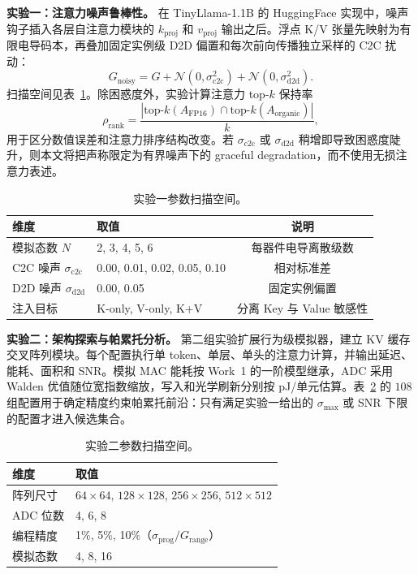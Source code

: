 \noindent\textbf{实验一：注意力噪声鲁棒性。}\label{sec:exp1_noise}
在 TinyLlama-1.1B 的 HuggingFace 实现中，噪声钩子插入各层自注意力模块的 $k_{\text{proj}}$ 和 $v_{\text{proj}}$ 输出之后。浮点 K/V 张量先映射为有限电导码本，再叠加固定实例级 D2D 偏置和每次前向传播独立采样的 C2C 扰动：
\begin{equation}
G_{\text{noisy}} = G + \mathcal{N}(0, \sigma_{\text{c2c}}^2) + \mathcal{N}(0, \sigma_{\text{d2d}}^2).
\label{eq:noise_model}
\end{equation}
扫描空间见表~\ref{tab:exp1_grid}。除困惑度外，实验计算注意力 top-$k$ 保持率
\begin{equation}
\rho_{\text{rank}} = \frac{|\text{top-}k(A_{\text{FP16}}) \cap \text{top-}k(A_{\text{organic}})|}{k},
\label{eq:rank_preservation}
\end{equation}
用于区分数值误差和注意力排序结构改变。若 $\sigma_{\text{c2c}}$ 或 $\sigma_{\text{d2d}}$ 稍增即导致困惑度陡升，则本文将把声称限定为有界噪声下的 graceful degradation，而不使用无损注意力表述。

\begin{table}[!htbp]
\centering
\caption{实验一参数扫描空间。}
\label{tab:exp1_grid}
\begin{tabular}{@{}llc@{}}
\toprule
维度 & 取值 & 说明 \\
\midrule
模拟态数 $N$ & 2, 3, 4, 5, 6 & 每器件电导离散级数 \\
C2C 噪声 $\sigma_{\text{c2c}}$ & 0.00, 0.01, 0.02, 0.05, 0.10 & 相对标准差 \\
D2D 噪声 $\sigma_{\text{d2d}}$ & 0.00, 0.05 & 固定实例偏置 \\
注入目标 & K-only, V-only, K+V & 分离 Key 与 Value 敏感性 \\
\bottomrule
\end{tabular}
\end{table}

\noindent\textbf{实验二：架构探索与帕累托分析。}\label{sec:exp2_arch}
第二组实验扩展行为级模拟器，建立 KV 缓存交叉阵列模块。每个配置执行单 token、单层、单头的注意力计算，并输出延迟、能耗、面积和 SNR。模拟 MAC 能耗按 Work~1 的一阶模型继承，ADC 采用 Walden 优值随位宽指数缩放，写入和光学刷新分别按 pJ/单元估算。表~\ref{tab:exp2_grid} 的 $108$ 组配置用于确定精度约束帕累托前沿：只有满足实验一给出的 $\sigma_{\text{max}}$ 或 SNR 下限的配置才进入候选集合。

\begin{table}[!htbp]
\centering
\caption{实验二参数扫描空间。}
\label{tab:exp2_grid}
\begin{tabular}{@{}ll@{}}
\toprule
维度 & 取值 \\
\midrule
阵列尺寸 & $64\times64$, $128\times128$, $256\times256$, $512\times512$ \\
ADC 位数 & 4, 6, 8 \\
编程精度 & 1\%, 5\%, 10\%（$\sigma_{\text{prog}}/G_{\text{range}}$） \\
模拟态数 & 4, 8, 16 \\
\bottomrule
\end{tabular}
\end{table}

